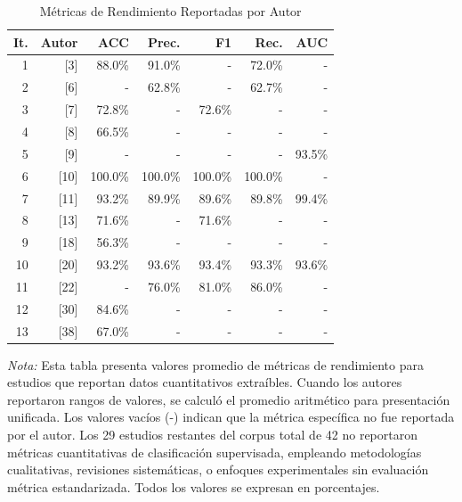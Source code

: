 \documentclass{ieeeaccess}
\begin{document}
	\begin{table}[htbp]
		\caption{Métricas de Rendimiento Reportadas por Autor}
		\label{tab:rendimiento}
		\centering
		\footnotesize
		\begin{tabular}{|r|r|r|r|r|r|r|}
			\hline
			\textbf{It.} & \textbf{Autor} & \textbf{ACC} & \textbf{Prec.} & \textbf{F1} & \textbf{Rec.} & \textbf{AUC} \\
			\hline
			1 & [3] & 88.0\% & 91.0\% & - & 72.0\% & - \\
			2 & [6] & - & 62.8\% & - & 62.7\% & - \\
			3 & [7] & 72.8\% & - & 72.6\% & - & - \\
			4 & [8] & 66.5\% & - & - & - & - \\
			5 & [9] & - & - & - & - & 93.5\% \\
			6 & [10] & 100.0\% & 100.0\% & 100.0\% & 100.0\% & - \\
			7 & [11] & 93.2\% & 89.9\% & 89.6\% & 89.8\% & 99.4\% \\
			8 & [13] & 71.6\% & - & 71.6\% & - & - \\
			9 & [18] & 56.3\% & - & - & - & - \\
			10 & [20] & 93.2\% & 93.6\% & 93.4\% & 93.3\% & 93.6\% \\
			11 & [22] & - & 76.0\% & 81.0\% & 86.0\% & - \\
			12 & [30] & 84.6\% & - & - & - & - \\
			13 & [38] & 67.0\% & - & - & - & - \\
			\hline
		\end{tabular}
		\begin{flushleft}
			\small \textit{Nota:} Esta tabla presenta valores promedio de métricas de rendimiento para estudios que reportan datos cuantitativos extraíbles. Cuando los autores reportaron rangos de valores, se calculó el promedio aritmético para presentación unificada. Los valores vacíos (-) indican que la métrica específica no fue reportada por el autor. Los 29 estudios restantes del corpus total de 42 no reportaron métricas cuantitativas de clasificación supervisada, empleando metodologías cualitativas, revisiones sistemáticas, o enfoques experimentales sin evaluación métrica estandarizada. Todos los valores se expresan en porcentajes.
		\end{flushleft}
	\end{table}
	
\end{document}
